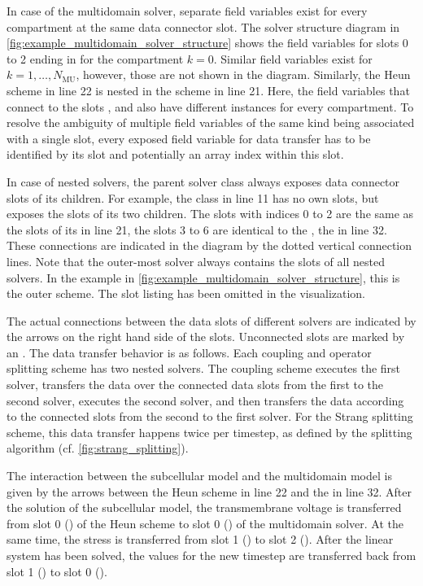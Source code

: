 In case of the multidomain solver, separate field variables exist for every compartment at the same data connector slot. The solver structure diagram in \cref{fig:example_multidomain_solver_structure} shows the field variables for slots 0 to 2 ending in  for the compartment $k=0$. Similar field variables exist for $k=1,\dots,N_\text{MU}$, however, those are not shown in the diagram. Similarly, the Heun scheme in line 22 is nested in the  scheme in line 21. Here, the field variables that connect to the slots ,  and  also have different instances for every compartment. To resolve the ambiguity of multiple field variables of the same kind being associated with a single slot, every exposed field variable for data transfer has to be identified by its slot and potentially an array index within this slot.

In case of nested solvers, the parent solver class always exposes data connector slots of its children. For example, the  class in line 11 has no own slots, but exposes the slots of its two children. The slots with indices 0 to 2 are the same as the slots of its  in line 21, the slots 3 to 6 are identical to the , the  in line 32. These connections are indicated in the diagram by the dotted vertical connection lines.
Note that the outer-most solver always contains the slots of all nested solvers. In the example in \cref{fig:example_multidomain_solver_structure}, this is the outer  scheme. The slot listing has been omitted in the visualization.

The actual connections between the data slots of different solvers are indicated by the arrows on the right hand side of the slots. Unconnected slots are marked by an .
The data transfer behavior is as follows. Each coupling and operator splitting scheme has two nested solvers. The coupling scheme executes the first solver, transfers the data over the connected data slots from the first to the second solver, executes the second solver, and then transfers the data according to the connected slots from the second to the first solver. For the Strang splitting scheme, this data transfer happens twice per timestep, as defined by the splitting algorithm (cf. \cref{fig:strang_splitting}).

The interaction between the subcellular model and the multidomain model is given by the arrows between the Heun scheme in line 22 and the  in line 32. After the solution of the subcellular model, the transmembrane voltage is transferred from slot 0 () of the Heun scheme to slot 0 () of the multidomain solver. At the same time, the stress is transferred from slot 1 () to slot 2 (). After the linear system has been solved, the values for the new timestep are transferred back from slot 1 () to slot 0 ().

